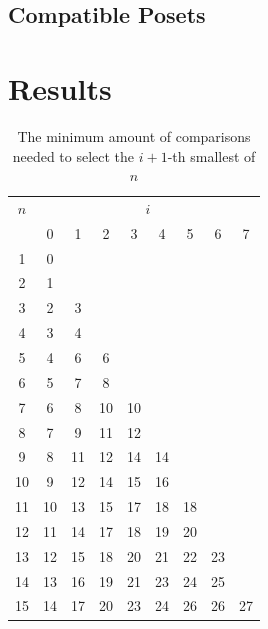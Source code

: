 \documentclass[10pt,journal,compsoc]{IEEEtran}
\begin{document}
\subsection{Compatible Posets}

\section{Results}

\begin{table}
  \centering
  \begin{tabular}{c|cccccccc}
    $n$ & \multicolumn{8}{c}{$i$}                                    \\
        & 0                       & 1  & 2  & 3  & 4  & 5  & 6  & 7  \\ \hline
    1   & 0                                                          \\
    2   & 1                                                          \\
    3   & 2                       & 3                                \\
    4   & 3                       & 4                                \\
    5   & 4                       & 6  & 6                           \\
    6   & 5                       & 7  & 8                           \\
    7   & 6                       & 8  & 10 & 10                     \\
    8   & 7                       & 9  & 11 & 12                     \\
    9   & 8                       & 11 & 12 & 14 & 14                \\
    10  & 9                       & 12 & 14 & 15 & 16                \\
    11  & 10                      & 13 & 15 & 17 & 18 & 18           \\
    12  & 11                      & 14 & 17 & 18 & 19 & 20           \\
    13  & 12                      & 15 & 18 & 20 & 21 & 22 & 23      \\
    14  & 13                      & 16 & 19 & 21 & 23 & 24 & 25      \\
    15  & 14                      & 17 & 20 & 23 & 24 & 26 & 26 & 27 \\
  \end{tabular}
  \caption{The minimum amount of comparisons needed to select the $i+1$-th smallest of $n$}
  \label{table:num-comparisons}
\end{table}
\end{document}
